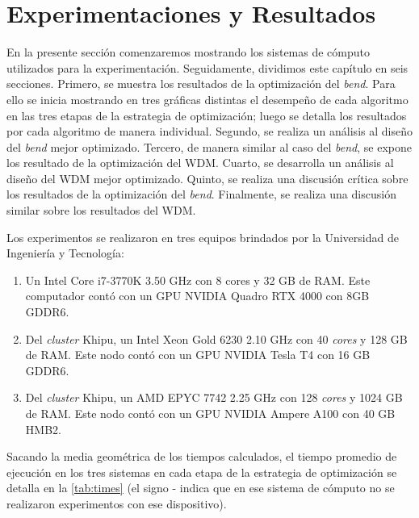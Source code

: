 \chapter{Experimentaciones y Resultados}\label{chapter:results}

En la presente sección comenzaremos mostrando los sistemas de cómputo utilizados para la experimentación.
Seguidamente, dividimos este capítulo en seis secciones.
Primero, se muestra los resultados de la optimización del \emph{bend}.
Para ello se inicia mostrando en tres gráficas distintas el desempeño de cada algoritmo en 
las tres etapas de la estrategia de optimización; luego se detalla los resultados por cada algoritmo
de manera individual.
Segundo, se realiza un análisis al diseño del \emph{bend} mejor optimizado.
Tercero, de manera similar al caso del \emph{bend}, se expone los resultado de la optimización del WDM.
Cuarto, se desarrolla un análisis al diseño del WDM mejor optimizado.
Quinto, se realiza una discusión crítica sobre los resultados de la optimización del \emph{bend}.
Finalmente, se realiza una discusión similar sobre los resultados del WDM.

Los experimentos se realizaron en tres equipos brindados por la Universidad de Ingeniería y Tecnología:

\begin{enumerate}
  \item Un Intel Core i7-3770K 3.50 GHz con 8 cores y 32 GB de RAM.
        Este computador contó con un GPU NVIDIA Quadro RTX 4000 con 8GB GDDR6.

  \item Del \emph{cluster} Khipu, un Intel Xeon Gold 6230 2.10 GHz con 40 \emph{cores} y 128 GB de RAM.
        Este nodo contó con un GPU NVIDIA Tesla T4 con 16 GB GDDR6.

  \item Del \emph{cluster} Khipu, un AMD EPYC 7742 2.25 GHz con 128 \emph{cores} y 1024 GB de RAM.
        Este nodo contó con un GPU NVIDIA Ampere A100 con 40 GB HMB2.

\end{enumerate}

Sacando la media geométrica de los tiempos calculados, el tiempo promedio de ejecución en los tres 
sistemas en cada etapa de la estrategia de optimización se detalla en la \autoref{tab:times} (el signo -
indica que en ese sistema de cómputo no se realizaron experimentos con ese dispositivo).


